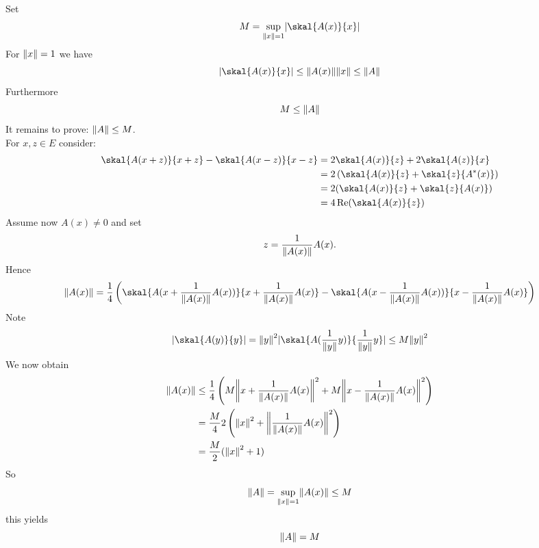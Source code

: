 \begin{beweis}
	Set 
	\[
		M = \sup_{\norm{x}=1} \abs{\skal{A(x)}{x}}
	\]
	For $\norm{x}=1$ we have
	\[
		\abs{\skal{A(x)}{x}} \leq \norm{A(x)} \norm{x} \leq \norm{A}
	\]
	Furthermore
	\[
		M \leq \norm{A}
	\]
	It remains to prove: $\norm{A} \leq M$. \\
	For $x,z \in E$ consider:
	\begin{align*}
		\skal{A(x+z)}{x+z} - \skal{A(x-z)}{x-z} &= 2 \skal{A(x)}{z} + 2 \skal{A(z)}{x} \\
		&= 2 \left( \skal{A(x)}{z} + \skal{z}{A^*(x)} \right) \\
		&= 2 (\skal{A(x)}{z} + \skal{z}{A(x)}) \\
		&= 4 \re( \skal{A(x)}{z})
	\end{align*}
	Assume now $A(x) \neq 0$ and set
	\[
		z = \frac{1}{\norm{A(x)}} A(x).
	\]
	Hence
	\[
		\norm{A(x)} = \frac{1}{4} \left( \skal{A(x+\frac{1}{\norm{A(x)}} A(x))}{x + \frac{1}{\norm{A(x)}} A(x)} 
		- \skal{A(x-\frac{1}{\norm{A(x)}} A(x))}{x- \frac{1}{\norm{A(x)}} A(x)} \right)
	\]
	Note \[
		\abs{\skal{A(y)}{y}} = \norm{y}^2 \abs{\skal{A(\frac{1}{\norm{y}}y)}{ \frac{1}{\norm{y}}y}} \leq M \norm{y}^2
	\]
	We now obtain
	\begin{align*}
		\norm{A(x)} &\leq \frac{1}{4} \left( M \norm{x+\frac{1}{\norm{A(x)}} A(x)}^2 + M \norm{x - \frac{1}{\norm{A(x)}} A(x)}^2 \right) \\
		&= \frac{M}{4} 2 \left( \norm{x}^2 + \norm{\frac{1}{\norm{A(x)}} A(x)}^2 \right) \\
		&= \frac{M}{2} (\norm{x}^2 +1) 
	\end{align*}
	So
	\[
		\norm{A} = \sup_{\norm{x}=1} \norm{A(x)} \leq M
	\]
	this yields
	\[
		\norm{A}= M
	\]
\end{beweis}